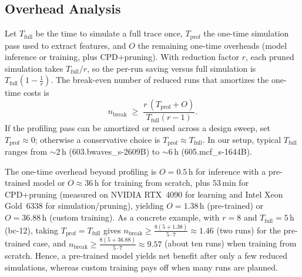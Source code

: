 \documentclass[conference]{IEEEtran}
\begin{document}
\subsection{Overhead Analysis}
\label{subsec:overhead}
Let $T_{\text{full}}$ be the time to simulate a full trace once, $T_{\text{prof}}$ the one-time simulation pass used to extract features, and $O$ the remaining one-time overheads (model inference or training, plus CPD+pruning). With reduction factor $r$, each pruned simulation takes $T_{\text{full}}/r$, so the per-run saving versus full simulation is $T_{\text{full}}\!\left(1-\frac{1}{r}\right)$. The break-even number of reduced runs that amortizes the one-time costs is
\begin{equation}
\label{eq:breakeven}
n_{\text{break}} \;\ge\; \frac{r\,(T_{\text{prof}} + O)}{T_{\text{full}}(r-1)}.
\end{equation}
If the profiling pass can be amortized or reused across a design sweep, set $T_{\text{prof}}\!\approx\!0$; otherwise a conservative choice is $T_{\text{prof}}\!\approx\!T_{\text{full}}$. In our setup, typical $T_{\text{full}}$ ranges from $\sim$2\,h (603.bwaves\_s-2609B) to $\sim$6\,h (605.mcf\_s-1644B). 

The one-time overhead beyond profiling is $O{=}0.5$\,h for inference with a pre-trained model or $O{\approx}36$\,h for training from scratch, plus $53$\,min for CPD+pruning (measured on NVIDIA RTX~4090 for learning and Intel Xeon Gold~6338 for simulation/pruning), yielding $O{=}1.38$\,h (pre-trained) or $O{=}36.88$\,h (custom training). As a concrete example, with $r{=}8$ and $T_{\text{full}}{=}5$\,h (bc-12), taking $T_{\text{prof}}{=}T_{\text{full}}$ gives
$n_{\text{break}} \!\ge\! \tfrac{8(5+1.38)}{5\cdot7}\!\approx\!1.46$ (two runs) for the pre-trained case, and
$n_{\text{break}} \!\ge\! \tfrac{8(5+36.88)}{5\cdot7}\!\approx\!9.57$ (about ten runs) when training from scratch. Hence, a pre-trained model yields net benefit after only a few reduced simulations, whereas custom training pays off when many runs are planned.
\end{document}
